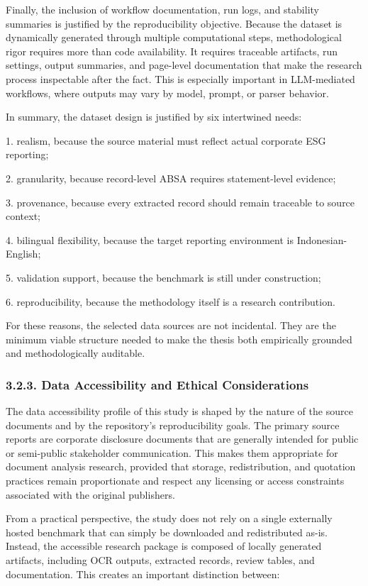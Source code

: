 \documentclass{article}
\begin{document}
Finally, the inclusion of workflow documentation, run logs, and stability summaries is justified by the reproducibility objective. Because the dataset is dynamically generated through multiple computational steps, methodological rigor requires more than code availability. It requires traceable artifacts, run settings, output summaries, and page-level documentation that make the research process inspectable after the fact. This is especially important in LLM-mediated workflows, where outputs may vary by model, prompt, or parser behavior.

In summary, the dataset design is justified by six intertwined needs:

1. realism, because the source material must reflect actual corporate ESG reporting;

2. granularity, because record-level ABSA requires statement-level evidence;

3. provenance, because every extracted record should remain traceable to source context;

4. bilingual flexibility, because the target reporting environment is Indonesian-English;

5. validation support, because the benchmark is still under construction;

6. reproducibility, because the methodology itself is a research contribution.

For these reasons, the selected data sources are not incidental. They are the minimum viable structure needed to make the thesis both empirically grounded and methodologically auditable.
\subsubsection*{ 3.2.3. Data Accessibility and Ethical Considerations}

The data accessibility profile of this study is shaped by the nature of the source documents and by the repository’s reproducibility goals. The primary source reports are corporate disclosure documents that are generally intended for public or semi-public stakeholder communication. This makes them appropriate for document analysis research, provided that storage, redistribution, and quotation practices remain proportionate and respect any licensing or access constraints associated with the original publishers.

From a practical perspective, the study does not rely on a single externally hosted benchmark that can simply be downloaded and redistributed as-is. Instead, the accessible research package is composed of locally generated artifacts, including OCR outputs, extracted records, review tables, and documentation. This creates an important distinction between:
\end{document}
